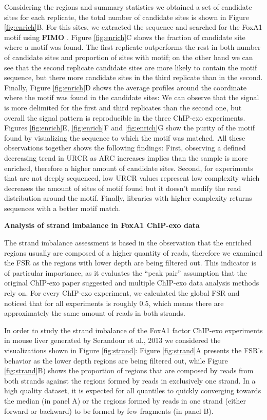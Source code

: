 \documentclass{bmcart}
\begin{document}
Considering the regions and summary statistics we obtained a set of
candidate sites for each replicate, the total number of candidate
sites is shown in Figure \ref{fig:enrich}B. For this sites, we
extracted the sequence and searched for the FoxA1 motif using
\textbf{FIMO} \cite{fimo}. Figure \ref{fig:enrich}C shows the fraction
of candidate site where a motif was found. The first replicate
outperforms the rest in both number of candidate sites and proportion
of sites with motif; on the other hand we can see that the second
replicate candidate sites are more likely to contain the motif
sequence, but there more candidate sites in the third replicate than
in the second. Finally, Figure \ref{fig:enrich}D shows the average
profiles around the coordinate where the motif was found in the
candidate sites: We can observe that the signal is more delimited for
the first and third replicates than the second one, but overall the
signal pattern is reproducible in the three ChIP-exo
experiments. Figures \ref{fig:enrich}E, \ref{fig:enrich}F and
\ref{fig:enrich}G show the purity of the motif found by visualizing
the sequence to which the motif was matched. All these observations
together shows the following findings: First, observing a defined
decreasing trend in $\mbox{URCR}$ as $\mbox{ARC}$ increases implies
than the sample is more enriched, therefore a higher amount of
candidate sites. Second, for experiments that are not deeply
sequenced, low $\mbox{URCR}$ values represent low complexity which
decreases the amount of sites of motif found but it doesn't modify the
read distribution around the motif. Finally, libraries with higher
complexity returns sequences with a better motif match.

\textbf{Analysis of strand imbalance in FoxA1 ChIP-exo data}

The strand imbalance assessment is based in the observation that the
enriched regions usually are composed of a higher quantity of reads,
therefore we examined the FSR as the regions with lower depth are
being filtered out. This indicator is of particular importance, as it
evaluates the ``peak pair'' assumption that the original ChIP-exo
paper suggested and multiple ChIP-exo data analysis methods rely
on. For every ChIP-exo experiment, we calculated the global FSR and
noticed that for all experiments is roughly $0.5$, which means there
are approximately the same amount of reads in both strands.

In order to study the strand imbalance of the FoxA1 factor ChIP-exo
experiments in mouse liver generated by Serandour et al.,
2013\nocite{exoillumina} we considered the visualizations shown in
Figure \ref{fig:strand}: Figure \ref{fig:strand}A presents the FSR's
behavior as the lower depth regions are being filtered out, while
Figure \ref{fig:strand}B) shows the proportion of regions that are
composed by reads from both strands against the regions formed by
reads in exclusively one strand. In a high quality dataset, it is
expected for all quantiles to quickly converging towards the median
(in panel A) or the regions formed by reads in one strand (either
forward or backward) to be formed by few fragments (in panel
B). 
\end{document}
